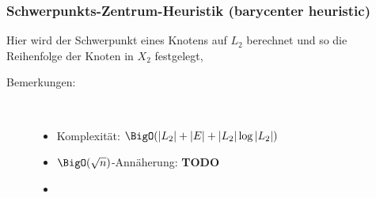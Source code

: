 \topbreak
\vspace*{-2\baselineskip}
\subsubsection{Schwerpunkts-Zentrum-Heuristik (barycenter heuristic)}
Hier wird der Schwerpunkt eines Knotens auf $L_2$ berechnet und so die Reihenfolge der Knoten in $X_2$ festgelegt, 
\begin{description}
	\item[Bemerkungen:] \ \\ \vspace*{-\baselineskip}
		\begin{itemize}[itemsep=-1pt]
			\item Komplexität: $\BigO(|L_2|+|E|+|L_2|\log|L_2|)$
			\item $\BigO(\sqrt{n})$-Annäherung: {\color{red}\textbf{TODO}}%
			\item {}
		\end{itemize}
\end{description}

